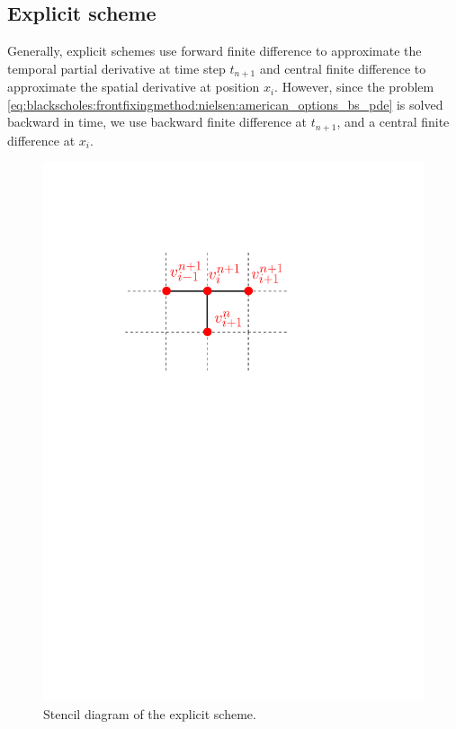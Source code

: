 \subsection{Explicit scheme} \label{sec:finitediferencesschemes:explicit_scheme}
Generally, explicit schemes use forward finite difference to approximate the temporal partial derivative at time step $t_{n+1}$ and central finite difference to approximate the spatial derivative at position $x_i$. However, since the problem \eqref{eq:blackscholes:frontfixingmethod:nielsen:american_options_bs_pde} is solved  backward in time, we use backward finite difference at $t_{n+1}$, and a central finite difference at $x_i$.
\begin{figure}[H]
  \centering
  \includegraphics[scale=.8]{chapters/chapter3/ExplicitStencil.pdf}
  \caption{Stencil diagram of the explicit scheme.}
  \label{fig:finitedifferencesschemes:explicit_stencil}
\end{figure}
